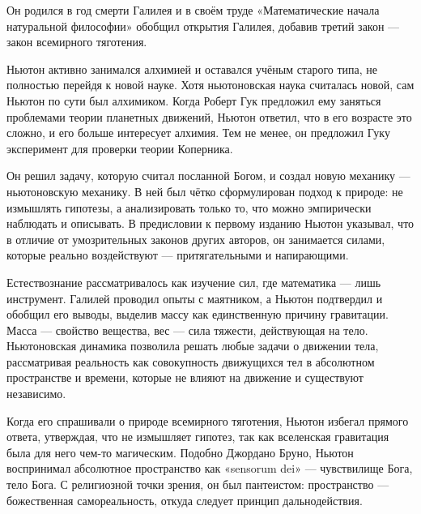 

Он родился в год смерти Галилея и в своём труде «Математические начала натуральной философии» обобщил открытия Галилея, добавив третий закон --- закон всемирного тяготения.

Ньютон активно занимался алхимией и оставался учёным старого типа, не полностью перейдя к новой науке. Хотя ньютоновская наука считалась новой, сам Ньютон по сути был алхимиком. Когда Роберт Гук предложил ему заняться проблемами теории планетных движений, Ньютон ответил, что в его возрасте это сложно, и его больше интересует алхимия. Тем не менее, он предложил Гуку эксперимент для проверки теории Коперника.

Он решил задачу, которую считал посланной Богом, и создал новую механику --- ньютоновскую механику. В ней был чётко сформулирован подход к природе: не измышлять гипотезы, а анализировать только то, что можно эмпирически наблюдать и описывать. В предисловии к первому изданию Ньютон указывал, что в отличие от умозрительных законов других авторов, он занимается силами, которые реально воздействуют --- притягательными и напирающими.

Естествознание рассматривалось как изучение сил, где математика --- лишь инструмент. Галилей проводил опыты с маятником, а Ньютон подтвердил и обобщил его выводы, выделив массу как единственную причину гравитации. Масса --- свойство вещества, вес --- сила тяжести, действующая на тело. Ньютоновская динамика позволила решать любые задачи о движении тела, рассматривая реальность как совокупность движущихся тел в абсолютном пространстве и времени, которые не влияют на движение и существуют независимо.

Когда его спрашивали о природе всемирного тяготения, Ньютон избегал прямого ответа, утверждая, что не измышляет гипотез, так как вселенская гравитация была для него чем-то магическим. Подобно Джордано Бруно, Ньютон воспринимал абсолютное пространство как «sensorum dei» --- чувствилище Бога, тело Бога. С религиозной точки зрения, он был пантеистом: пространство --- божественная самореальность, откуда следует принцип дальнодействия.

